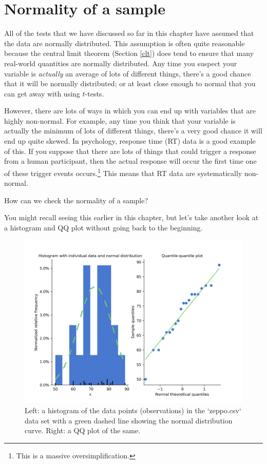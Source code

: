 \documentclass[
  11pt,
  a4paper,
  twoside,symmetric,openright]{book}
\theoremstyle{break}
\theoremstyle{break}
\begin{document}
\section{Normality of a sample}\label{shapiro}

All of the tests that we have discussed so far in this chapter have assumed that the data are normally distributed. This assumption is often quite reasonable because the central limit theorem (Section \ref{clt}) does tend to ensure that many real-world quantities are normally distributed. Any time you suspect your variable is \emph{actually} an average of lots of different things, there's a good chance that it will be normally distributed; or at least close enough to normal that you can get away with using \(t\)-tests.

However, there are lots of ways in which you can end up with variables that are highly non-normal. For example, any time you think that your variable is actually the minimum of lots of different things, there's a very good chance it will end up quite skewed. In psychology, response time (RT) data is a good example of this. If you suppose that there are lots of things that could trigger a response from a human participant, then the actual response will occur the first time one of these trigger events occurs.\footnote{This is a massive oversimplification.} This means that RT data are systematically non-normal.

How can we check the normality of a sample?

You might recall seeing this earlier in this chapter, but let's take another look at a histogram and QQ plot without going back to the beginning.

\begin{figure}

{\centering \includegraphics[width=0.6\linewidth]{resources/image/zeppohist} 

}

\caption{Left: a histogram of the data points (observations) in the `zeppo.csv` data set with a green dashed line showing the normal distribution curve. Right: a QQ plot of the same.}\label{fig:zeppore}
\end{figure}
\end{document}
